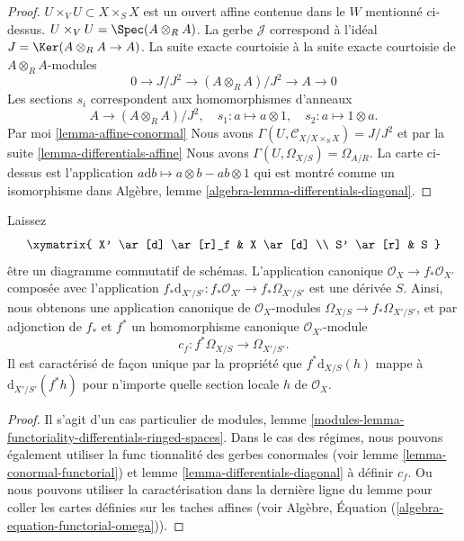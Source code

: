 \begin{proof}
$U \times_V U \subset X \times_S X$ est un ouvert affine contenue dans le $W$ mentionné ci-dessus.
$U \times_V U = \Spec(A \otimes_R A)$. La gerbe $\mathcal{J}$ correspond à l'idéal
$J = \Ker(A \otimes_R A \to A)$. La suite exacte courtoisie à la suite exacte courtoisie de $A \otimes_R A$-modules
$$
0 \to J/J^2 \to (A \otimes_R A)/J^2 \to A \to 0
$$
Les sections $s_i$ correspondent aux homomorphismes d'anneaux
$$
A \longrightarrow (A \otimes_R A)/J^2,\quad
s_1 : a \mapsto a \otimes 1,\quad
s_2 : a \mapsto 1 \otimes a.
$$
Par moi \ref{lemma-affine-conormal} Nous avons
$\Gamma(U, \mathcal{C}_{X/X \times_S X}) = J/J^2$ et par la suite \ref{lemma-differentials-affine}
Nous avons $\Gamma(U, \Omega_{X/S}) = \Omega_{A/R}$. La carte ci-dessus est l'application $a \text{d}b \mapsto a \otimes b - ab \otimes 1$
qui est montré comme un isomorphisme dans Algèbre, lemme \ref{algebra-lemma-differentials-diagonal}.

\end{proof}

\begin{lemma}

\label{lemma-functoriality-differentials}
Laissez $$
\xymatrix{
X' \ar[d] \ar[r]_f & X \ar[d] \\
S' \ar[r] & S
}
$$ être un diagramme commutatif de schémas. L'application canonique $\mathcal{O}_X \to f_*\mathcal{O}_{X'}$ composée avec l'application $f_*\text{d}_{X'/S'} : f_*\mathcal{O}_{X'} \to f_*\Omega_{X'/S'}$ est une dérivée $S$. Ainsi, nous obtenons une application canonique de $\mathcal{O}_X$-modules $\Omega_{X/S} \to f_*\Omega_{X'/S'}$, et par adjonction de $f_*$ et $f^*$ un homomorphisme canonique $\mathcal{O}_{X'}$-module $$
c_f : f^*\Omega_{X/S} \longrightarrow \Omega_{X'/S'}.
$$ Il est caractérisé de façon unique par la propriété que $f^*\text{d}_{X/S}(h)$ mappe à $\text{d}_{X'/S'}(f^* h)$ pour n'importe quelle section locale $h$ de $\mathcal{O}_X$.
\end{lemma}

\begin{proof}

Il s'agit d'un cas particulier de modules, lemme \ref{modules-lemma-functoriality-differentials-ringed-spaces}. Dans le cas des régimes, nous pouvons également utiliser la func tionnalité des gerbes conormales (voir lemme \ref{lemma-conormal-functorial}) et lemme \ref{lemma-differentials-diagonal} à définir $c_f$. Ou nous pouvons utiliser la caractérisation dans la dernière ligne du lemme pour coller les cartes définies sur les taches affines (voir Algèbre, Équation (\ref{algebra-equation-functorial-omega})).

\end{proof}

